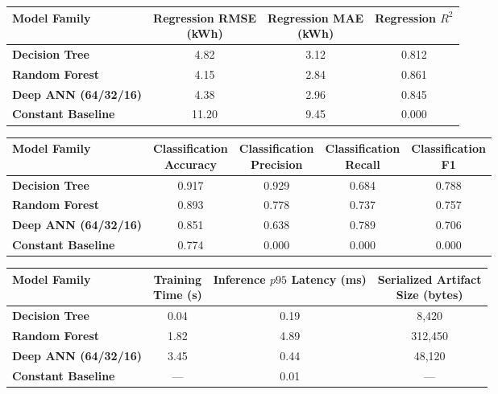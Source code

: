 \documentclass[
]{article}
\begin{document}
\begingroup
\small
\setlength{\tabcolsep}{5pt}
\renewcommand{\arraystretch}{1.2}
\begin{center}
\begin{tabular}{@{}lccc@{}}
\toprule
\textbf{Model Family} & \shortstack{\textbf{Regression RMSE}\\\textbf{(kWh)}} &
\shortstack{\textbf{Regression MAE}\\\textbf{(kWh)}} &
\shortstack{\textbf{Regression}\\\textbf{\(R^2\)}} \\
\midrule
\textbf{Decision Tree} & 4.82 & 3.12 & 0.812 \\
\textbf{Random Forest} & 4.15 & 2.84 & 0.861 \\
\textbf{Deep ANN (64/32/16)} & 4.38 & 2.96 & 0.845 \\
\textbf{Constant Baseline} & 11.20 & 9.45 & 0.000 \\
\bottomrule
\end{tabular}
\end{center}

\vspace{0.8em}
\begin{center}
\begin{tabular}{@{}lcccc@{}}
\toprule
\textbf{Model Family} & \shortstack{\textbf{Classification}\\\textbf{Accuracy}} &
\shortstack{\textbf{Classification}\\\textbf{Precision}} &
\shortstack{\textbf{Classification}\\\textbf{Recall}} &
\shortstack{\textbf{Classification}\\\textbf{F1}} \\
\midrule
\textbf{Decision Tree} & 0.917 & 0.929 & 0.684 & 0.788 \\
\textbf{Random Forest} & 0.893 & 0.778 & 0.737 & 0.757 \\
\textbf{Deep ANN (64/32/16)} & 0.851 & 0.638 & 0.789 & 0.706 \\
\textbf{Constant Baseline} & 0.774 & 0.000 & 0.000 & 0.000 \\
\bottomrule
\end{tabular}
\end{center}

\vspace{0.8em}
\begin{center}
\begin{tabular}{@{}lccc@{}}
\toprule
\textbf{Model Family} & \shortstack{\textbf{Training}\\\textbf{Time (s)}} &
\shortstack{\textbf{Inference \(p95\)}\\\textbf{Latency (ms)}} &
\shortstack{\textbf{Serialized Artifact}\\\textbf{Size (bytes)}} \\
\midrule
\textbf{Decision Tree} & 0.04 & 0.19 & 8,420 \\
\textbf{Random Forest} & 1.82 & 4.89 & 312,450 \\
\textbf{Deep ANN (64/32/16)} & 3.45 & 0.44 & 48,120 \\
\textbf{Constant Baseline} & --- & 0.01 & --- \\
\bottomrule
\end{tabular}
\end{center}
\endgroup
\end{document}
